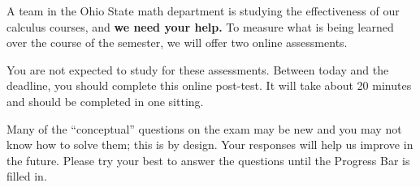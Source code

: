 \documentclass{ximera}
\begin{document}
A team in the Ohio State math department is studying the effectiveness
of our calculus courses, and \textbf{we need your help.}  To measure
what is being learned over the course of the semester, we will offer
two online assessments.

You are not expected to study for these assessments.  Between today
and the deadline, you should complete this online post-test.  It will
take about 20 minutes and should be completed in one sitting.

Many of the ``conceptual'' questions on the exam may be new and you
may not know how to solve them; this is by design.  Your responses
will help us improve in the future.  Please try your best to answer
the questions until the Progress Bar is filled in.
\end{document}
